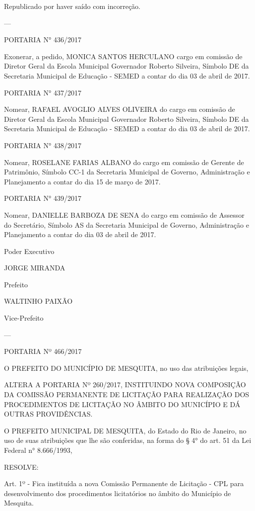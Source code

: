 \documentclass{doliberto}
\begin{document}
Republicado por haver saído com incorreção. 

---
 
PORTARIA N° 436/2017 
 
Exonerar,  a  pedido,  MONICA  SANTOS  HERCULANO cargo 
em  comissão  de  Diretor  Geral  da  Escola  Municipal 
Governador  Roberto  Silveira,  Símbolo  DE  da  Secretaria 
Municipal  de  Educação  -  SEMED  a  contar  do  dia  03  de 
abril de 2017. 
 
PORTARIA N° 437/2017 
 
Nomear, RAFAEL AVOGLIO ALVES OLIVEIRA do cargo em 
comissão  de  Diretor  Geral  da  Escola  Municipal 
Governador  Roberto  Silveira,  Símbolo  DE  da  Secretaria 
Municipal  de  Educação  -  SEMED  a  contar  do  dia  03  de 
abril de 2017. 
 
PORTARIA N° 438/2017 
 
Nomear,  ROSELANE  FARIAS  ALBANO  do  cargo  em 
comissão  de  Gerente  de  Patrimônio,  Símbolo  CC-1  da 
Secretaria  Municipal  de  Governo,  Administração  e 
Planejamento a contar do dia 15 de março de 2017. 
 
PORTARIA N° 439/2017 
 
Nomear,  DANIELLE  BARBOZA  DE  SENA  do  cargo  em 
comissão  de  Assessor  do  Secretário,  Símbolo  AS  da 
Secretaria  Municipal  de  Governo,  Administração  e 
Planejamento a contar do dia 03 de abril de 2017. 

Poder Executivo  

JORGE MIRANDA 

Prefeito 

WALTINHO PAIXÃO 

Vice-Prefeito 

---

PORTARIA Nº 466/2017 
 
 
O  PREFEITO  DO  MUNICÍPIO  DE  MESQUITA,  no  uso  das 
atribuições legais, 
  
ALTERA  A  PORTARIA  Nº  260/2017,  INSTITUINDO  NOVA 
COMPOSIÇÃO DA COMISSÃO PERMANENTE DE LICITAÇÃO 
PARA  REALIZAÇÃO  DOS  PROCEDIMENTOS  DE  LICITAÇÃO 
NO ÂMBITO DO MUNICÍPIO E DÁ OUTRAS PROVIDÊNCIAS. 
 
O  PREFEITO  MUNICIPAL  DE  MESQUITA,  do  Estado  do Rio 
de  Janeiro,  no  uso  de  suas  atribuições  que  lhe  são 
conferidas,  na  forma  do  §  4°  do  art.  51  da  Lei  Federal  n° 
8.666/1993, 
  
RESOLVE:  
 
Art.  1º  -  Fica  instituída  a  nova  Comissão  Permanente  de 
Licitação  -  CPL  para  desenvolvimento  dos  procedimentos 
licitatórios no âmbito do Município de Mesquita. 
  
\end{document}
